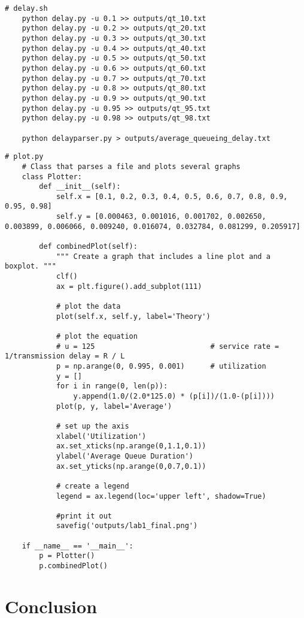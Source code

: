 \documentclass[11pt]{article}
\begin{document}
\vspace{5mm}

\begin{absolutelynopagebreak}
\begin{lstlisting}
# delay.sh
    python delay.py -u 0.1 >> outputs/qt_10.txt
    python delay.py -u 0.2 >> outputs/qt_20.txt
    python delay.py -u 0.3 >> outputs/qt_30.txt
    python delay.py -u 0.4 >> outputs/qt_40.txt
    python delay.py -u 0.5 >> outputs/qt_50.txt
    python delay.py -u 0.6 >> outputs/qt_60.txt
    python delay.py -u 0.7 >> outputs/qt_70.txt
    python delay.py -u 0.8 >> outputs/qt_80.txt
    python delay.py -u 0.9 >> outputs/qt_90.txt
    python delay.py -u 0.95 >> outputs/qt_95.txt
    python delay.py -u 0.98 >> outputs/qt_98.txt

    python delayparser.py > outputs/average_queueing_delay.txt
\end{lstlisting}
\end{absolutelynopagebreak}

\vspace{5mm}

\begin{absolutelynopagebreak}
\begin{lstlisting}
# plot.py
    # Class that parses a file and plots several graphs
    class Plotter:
        def __init__(self):
            self.x = [0.1, 0.2, 0.3, 0.4, 0.5, 0.6, 0.7, 0.8, 0.9, 0.95, 0.98]
            self.y = [0.000463, 0.001016, 0.001702, 0.002650, 0.003899, 0.006066, 0.009240, 0.016074, 0.032784, 0.081299, 0.205917]

        def combinedPlot(self):
            """ Create a graph that includes a line plot and a boxplot. """
            clf()
            ax = plt.figure().add_subplot(111)

            # plot the data
            plot(self.x, self.y, label='Theory')

            # plot the equation
            # u = 125                           # service rate = 1/transmission delay = R / L
            p = np.arange(0, 0.995, 0.001)      # utilization
            y = []
            for i in range(0, len(p)):
                y.append(1.0/(2.0*125.0) * (p[i])/(1.0-(p[i])))
            plot(p, y, label='Average')

            # set up the axis
            xlabel('Utilization')
            ax.set_xticks(np.arange(0,1.1,0.1))
            ylabel('Average Queue Duration')
            ax.set_yticks(np.arange(0,0.7,0.1))

            # create a legend
            legend = ax.legend(loc='upper left', shadow=True)

            #print it out
            savefig('outputs/lab1_final.png')

    if __name__ == '__main__':
        p = Plotter()
        p.combinedPlot()
\end{lstlisting}
\end{absolutelynopagebreak}
\vspace{5mm}

\section{Conclusion}
\end{document}
